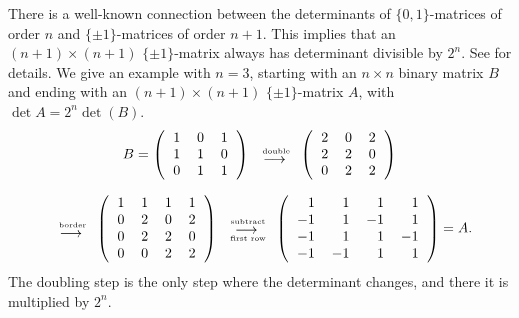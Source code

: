 There is a well-known 
connection between the determinants of
$\{0,1\}$-matrices of order $n$ and
$\{\pm1\}$-matrices of order $n+1$.
This implies that an $(n+1)\times (n+1)$ $ \{\pm1\}$-matrix 
always has determinant divisible
by $ 2^{n}$.
See \cite{Neubauer97} %
for details.
We give an example with $n=3$, starting with an $n\times n$ binary
matrix $B$ and ending with an $(n+1)\times(n+1)$ $\{\pm1\}$-matrix $A$,
with $\det A = 2^n\det(B)$.
\[
B = 
\left(\begin{tabular}{ccc}
$1$&$0$&$1$\\
$1$&$1$&$0$\\
$0$&$1$&$1$
\end{tabular}\right)
\begin{tabular}{c}
\begin{tiny}{ double}\end{tiny}\\[-5pt]
$\longrightarrow$
\end{tabular}
\left(\begin{tabular}{rrr}
$2$&$0$&$2$\\
$2$&$2$&$0$\\
$0$&$2$&$2$
\end{tabular}\right)
\]

\[
\begin{tabular}{c}
\begin{tiny}{ border}\end{tiny}\\[-5pt]
$\longrightarrow$
\end{tabular}
\left(\begin{tabular}{rrrr}
1&1&1&1\\
$0$&$2$&$0$&$2$\\
$0$&$2$&$2$&$0$\\
$0$&$0$&$2$&$2$
\end{tabular}\right)
\begin{tabular}{c}
\begin{tiny}{ subtract}\end{tiny}\\[-5pt]
$\longrightarrow$\\[-7pt]
\begin{tiny}{ first row}\end{tiny}
\end{tabular}
\left(\begin{tabular}{rrrr}
$1$&$1$&$1$&$1$\\
$-1$&$1$&$-1$&$1$\\
$-1$&$1$&$1$&$-1$\\
$-1$&$-1$&$1$&$1$
\end{tabular}\right) = A.
\]
The doubling step is the
only step where the determinant changes, and there it is multiplied
by $2^n$.

